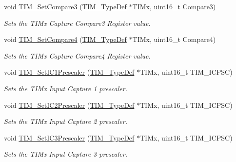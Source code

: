 \begin{DoxyCompactItemize}
void \mbox{\hyperlink{group___t_i_m___exported___functions_ga416df50f4223351e366ae40a4ec163ae}{T\+I\+M\+\_\+\+Set\+Compare3}} (\mbox{\hyperlink{struct_t_i_m___type_def}{T\+I\+M\+\_\+\+Type\+Def}} $\ast$T\+I\+Mx, uint16\+\_\+t Compare3)
\begin{DoxyCompactList}\small\item\em Sets the T\+I\+Mx Capture Compare3 Register value. \end{DoxyCompactList}\item 
void \mbox{\hyperlink{group___t_i_m___exported___functions_gaf428edf474804691d6f587e78c97a082}{T\+I\+M\+\_\+\+Set\+Compare4}} (\mbox{\hyperlink{struct_t_i_m___type_def}{T\+I\+M\+\_\+\+Type\+Def}} $\ast$T\+I\+Mx, uint16\+\_\+t Compare4)
\begin{DoxyCompactList}\small\item\em Sets the T\+I\+Mx Capture Compare4 Register value. \end{DoxyCompactList}\item 
void \mbox{\hyperlink{group___t_i_m___exported___functions_gaf0f684dea88e222de9689d8ed0ca8805}{T\+I\+M\+\_\+\+Set\+I\+C1\+Prescaler}} (\mbox{\hyperlink{struct_t_i_m___type_def}{T\+I\+M\+\_\+\+Type\+Def}} $\ast$T\+I\+Mx, uint16\+\_\+t T\+I\+M\+\_\+\+I\+C\+P\+SC)
\begin{DoxyCompactList}\small\item\em Sets the T\+I\+Mx Input Capture 1 prescaler. \end{DoxyCompactList}\item 
void \mbox{\hyperlink{group___t_i_m___exported___functions_ga3cc4869b5fe73271808512c89322a325}{T\+I\+M\+\_\+\+Set\+I\+C2\+Prescaler}} (\mbox{\hyperlink{struct_t_i_m___type_def}{T\+I\+M\+\_\+\+Type\+Def}} $\ast$T\+I\+Mx, uint16\+\_\+t T\+I\+M\+\_\+\+I\+C\+P\+SC)
\begin{DoxyCompactList}\small\item\em Sets the T\+I\+Mx Input Capture 2 prescaler. \end{DoxyCompactList}\item 
void \mbox{\hyperlink{group___t_i_m___exported___functions_ga76f906383b8132ebe00dffadb70cf7f9}{T\+I\+M\+\_\+\+Set\+I\+C3\+Prescaler}} (\mbox{\hyperlink{struct_t_i_m___type_def}{T\+I\+M\+\_\+\+Type\+Def}} $\ast$T\+I\+Mx, uint16\+\_\+t T\+I\+M\+\_\+\+I\+C\+P\+SC)
\begin{DoxyCompactList}\small\item\em Sets the T\+I\+Mx Input Capture 3 prescaler. \end{DoxyCompactList}\item 

\end{DoxyCompactItemize}
